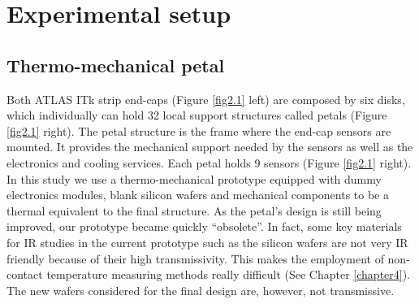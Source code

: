 \pagestyle{standard}

\chapter{Experimental setup}\label{chapter2}

	\thispagestyle{chapter-first-page}
	
	\section{Thermo-mechanical petal}\label{section2.1}
	
		Both ATLAS ITk strip end-caps (Figure \ref{fig2.1} left) are composed by six disks, which individually can hold 32 local support structures called petals (Figure \ref{fig2.1} right). The petal structure is the frame where the end-cap sensors are mounted. It provides the mechanical support needed by the sensors as well as the electronics and cooling services. Each petal holds 9 sensors (Figure \ref{fig2.1} right). 
		In this study we use a thermo-mechanical prototype equipped with dummy electronics modules, blank silicon wafers and mechanical components to be a thermal equivalent to the final structure. As the petal’s design is still being improved, our prototype became quickly “obsolete”. In fact, some key materials for IR studies in the current prototype such as the silicon wafers are not very IR friendly because of their high transmissivity. This makes the employment of non-contact temperature measuring methods really difficult (See Chapter \ref{chapter4}). The new wafers considered for the final design are, however, not transmissive.
				
